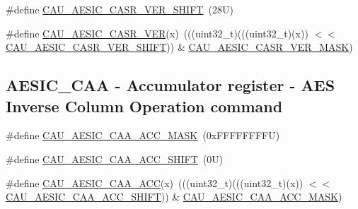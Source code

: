 \begin{DoxyCompactItemize}
\item 
\#define \mbox{\hyperlink{group___c_a_u___register___masks_gac5a230498e5cdfde6c562f568d90acbf}{C\+A\+U\+\_\+\+A\+E\+S\+I\+C\+\_\+\+C\+A\+S\+R\+\_\+\+V\+E\+R\+\_\+\+S\+H\+I\+FT}}~(28\+U)
\item 
\#define \mbox{\hyperlink{group___c_a_u___register___masks_ga83b8e9f334baf5a5cae0e96e17afa8f8}{C\+A\+U\+\_\+\+A\+E\+S\+I\+C\+\_\+\+C\+A\+S\+R\+\_\+\+V\+ER}}(x)~(((uint32\+\_\+t)(((uint32\+\_\+t)(x)) $<$$<$ \mbox{\hyperlink{group___c_a_u___register___masks_gac5a230498e5cdfde6c562f568d90acbf}{C\+A\+U\+\_\+\+A\+E\+S\+I\+C\+\_\+\+C\+A\+S\+R\+\_\+\+V\+E\+R\+\_\+\+S\+H\+I\+FT}})) \& \mbox{\hyperlink{group___c_a_u___register___masks_ga7c4921877f2a358cf58b360ae349d6e4}{C\+A\+U\+\_\+\+A\+E\+S\+I\+C\+\_\+\+C\+A\+S\+R\+\_\+\+V\+E\+R\+\_\+\+M\+A\+SK}})
\end{DoxyCompactItemize}
\subsection*{A\+E\+S\+I\+C\+\_\+\+C\+AA -\/ Accumulator register -\/ A\+ES Inverse Column Operation command}
\begin{DoxyCompactItemize}
\item 
\#define \mbox{\hyperlink{group___c_a_u___register___masks_ga6a186e09605a44795ee98614428823a0}{C\+A\+U\+\_\+\+A\+E\+S\+I\+C\+\_\+\+C\+A\+A\+\_\+\+A\+C\+C\+\_\+\+M\+A\+SK}}~(0x\+F\+F\+F\+F\+F\+F\+F\+F\+U)
\item 
\#define \mbox{\hyperlink{group___c_a_u___register___masks_gaac1b5dee501da2ddedcc86c0a91246f4}{C\+A\+U\+\_\+\+A\+E\+S\+I\+C\+\_\+\+C\+A\+A\+\_\+\+A\+C\+C\+\_\+\+S\+H\+I\+FT}}~(0\+U)
\item 
\#define \mbox{\hyperlink{group___c_a_u___register___masks_gac34a260005f2ff88c44b04865363e794}{C\+A\+U\+\_\+\+A\+E\+S\+I\+C\+\_\+\+C\+A\+A\+\_\+\+A\+CC}}(x)~(((uint32\+\_\+t)(((uint32\+\_\+t)(x)) $<$$<$ \mbox{\hyperlink{group___c_a_u___register___masks_gaac1b5dee501da2ddedcc86c0a91246f4}{C\+A\+U\+\_\+\+A\+E\+S\+I\+C\+\_\+\+C\+A\+A\+\_\+\+A\+C\+C\+\_\+\+S\+H\+I\+FT}})) \& \mbox{\hyperlink{group___c_a_u___register___masks_ga6a186e09605a44795ee98614428823a0}{C\+A\+U\+\_\+\+A\+E\+S\+I\+C\+\_\+\+C\+A\+A\+\_\+\+A\+C\+C\+\_\+\+M\+A\+SK}})
\end{DoxyCompactItemize}
